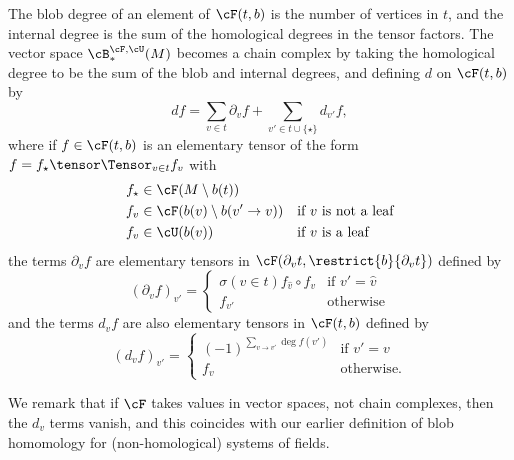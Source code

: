 The blob degree of an element of $\cF(t,b)$ is the number of vertices in $t$, and the internal degree is the sum of the homological degrees in the tensor factors.
The vector space $\cB_*^{\cF,\cU}(M)$ becomes a chain complex by taking the homological degree to be the sum of the blob and internal degrees, and defining $d$ on $\cF(t,b)$ by
\begin{equation*}
d f = \sum_{v \in t} \partial_v f + \sum_{v' \in t \cup \{\star\}} d_{v'} f,
\end{equation*}
where if $f \in \cF(t,b)$ is an elementary tensor of the form $f = f_\star \tensor \Tensor_{v \in t} f_v$ with
\begin{align*}
f_\star & \in \cF(M \setminus b(t)) && \\
f_v       & \in \cF(b(v) \setminus b(v' \to v)) && \text{if $v$ is not a leaf} \\
f_v       & \in \cU(b(v)) && \text{if $v$ is a leaf}
\end{align*}
the terms $\partial_v f$ are elementary tensors in $\cF(\partial_v t, \restrict{b}{\partial_v t})$ defined by
\begin{equation*}
(\partial_v f)_{v'} = \begin{cases} \sigma(v \in t) f_{\hat{v}} \circ f_v & \text{if $v' = \hat{v}$} \\ f_{v'} & \text{otherwise} \end{cases}
\end{equation*}
and the terms $d_v f$ are also elementary tensors in $\cF(t, b)$ defined by
\begin{equation*}
(d_v f)_{v'} = \begin{cases} (-1)^{\sum_{v \to v'} \deg f(v')} & \text{if $v'=v$} \\ f_v & \text{otherwise.} \end{cases}
\end{equation*}

We remark that if $\cF$ takes values in vector spaces, not chain complexes, then the $d_v$ terms vanish, and this coincides with our earlier definition of blob homomology for (non-homological) systems of fields.


